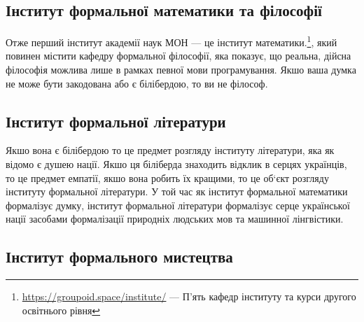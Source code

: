 \subsection{Інститут формальної математики та філософії}

Отже перший інститут академії наук МОН — це інститут
математики.\footnote{ \url{https://groupoid.space/institute/} --- П'ять кафедр інституту
та курси другого освітнього рівня}, який повинен містити кафедру формальної філософії,
яка показує, що реальна, дійсна філософія можлива лише в рамках певної мови програмування.
Якшо ваша думка не може бути закодована або є білібердою, то ви не філософ.

\subsection{Інститут формальної літератури}

Якшо вона є білібердою то це предмет розгляду інституту літератури, яка як відомо є душею
нації. Якшо ця біліберда знаходить відклик в серцях українців, то це предмет емпатії, якшо
вона робить їх кращими, то це об‘єкт розгляду інституту формальної літератури. У той час
як інститут формальної математики формалізує думку, інститут формальної літератури
формалізує серце української нації засобами формалізації природніх людських мов та
машинної лінгвістики.

\subsection{Інститут формального мистецтва}


